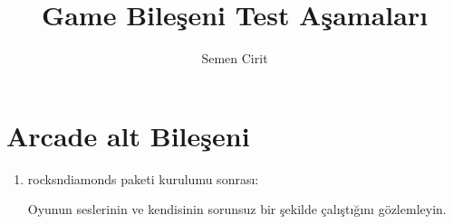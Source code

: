 \documentclass[a4paper,10pt]{article}
\title{Game Bileşeni Test Aşamaları}
\author{Semen Cirit}
\begin{document}
\maketitle

\section{Arcade alt Bileşeni}
\begin{enumerate}
\item rocksndiamonds paketi kurulumu sonrası:

Oyunun seslerinin ve kendisinin sorunsuz bir şekilde çalıştığını gözlemleyin.	
\end{enumerate}
\end{document}
